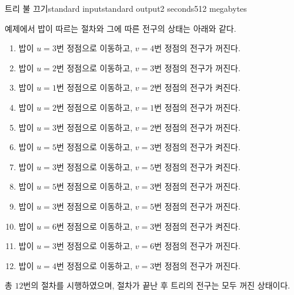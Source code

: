 \begin{problem}{트리 불 끄기}{standard input}{standard output}{2 seconds}{512 megabytes}
\begin{example}
%
\end{example}

\Note
예제에서 밥이 따르는 절차와 그에 따른 전구의 상태는 아래와 같다.

\begin{enumerate}
  \item 밥이 $u=3$번 정점으로 이동하고, $v=4$번 정점의 전구가 꺼진다.
  \item 밥이 $u=2$번 정점으로 이동하고, $v=3$번 정점의 전구가 꺼진다.
  \item 밥이 $u=1$번 정점으로 이동하고, $v=2$번 정점의 전구가 켜진다.
  \item 밥이 $u=2$번 정점으로 이동하고, $v=1$번 정점의 전구가 꺼진다.
  \item 밥이 $u=3$번 정점으로 이동하고, $v=2$번 정점의 전구가 꺼진다.
  \item 밥이 $u=5$번 정점으로 이동하고, $v=3$번 정점의 전구가 켜진다.
  \item 밥이 $u=3$번 정점으로 이동하고, $v=5$번 정점의 전구가 켜진다.
  \item 밥이 $u=5$번 정점으로 이동하고, $v=3$번 정점의 전구가 꺼진다.
  \item 밥이 $u=3$번 정점으로 이동하고, $v=5$번 정점의 전구가 꺼진다.
  \item 밥이 $u=6$번 정점으로 이동하고, $v=3$번 정점의 전구가 켜진다.
  \item 밥이 $u=3$번 정점으로 이동하고, $v=6$번 정점의 전구가 꺼진다.
  \item 밥이 $u=4$번 정점으로 이동하고, $v=3$번 정점의 전구가 꺼진다.
\end{enumerate}

총 $12$번의 절차를 시행하였으며, 절차가 끝난 후 트리의 전구는 모두 꺼진 상태이다.

\end{problem}

